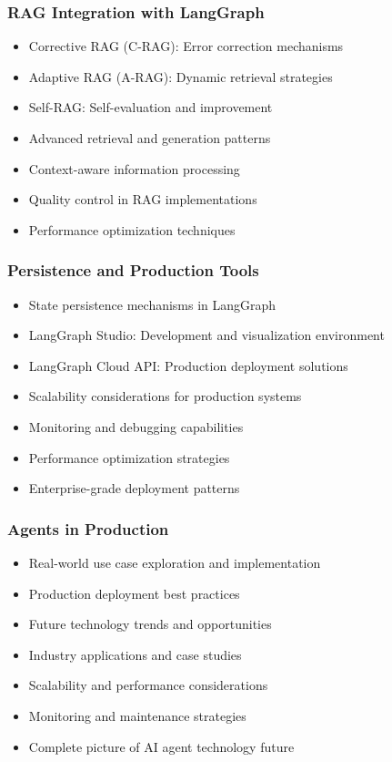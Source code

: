\begin{frame}[fragile]\frametitle{RAG Integration with LangGraph}
      \begin{itemize}
        \item Corrective RAG (C-RAG): Error correction mechanisms
        \item Adaptive RAG (A-RAG): Dynamic retrieval strategies
        \item Self-RAG: Self-evaluation and improvement
        \item Advanced retrieval and generation patterns
        \item Context-aware information processing
        \item Quality control in RAG implementations
        \item Performance optimization techniques
      \end{itemize}
\end{frame}

\begin{frame}[fragile]\frametitle{Persistence and Production Tools}
      \begin{itemize}
        \item State persistence mechanisms in LangGraph
        \item LangGraph Studio: Development and visualization environment
        \item LangGraph Cloud API: Production deployment solutions
        \item Scalability considerations for production systems
        \item Monitoring and debugging capabilities
        \item Performance optimization strategies
        \item Enterprise-grade deployment patterns
      \end{itemize}
\end{frame}

\begin{frame}[fragile]\frametitle{Agents in Production}
      \begin{itemize}
        \item Real-world use case exploration and implementation
        \item Production deployment best practices
        \item Future technology trends and opportunities
        \item Industry applications and case studies
        \item Scalability and performance considerations
        \item Monitoring and maintenance strategies
        \item Complete picture of AI agent technology future
      \end{itemize}
\end{frame}


